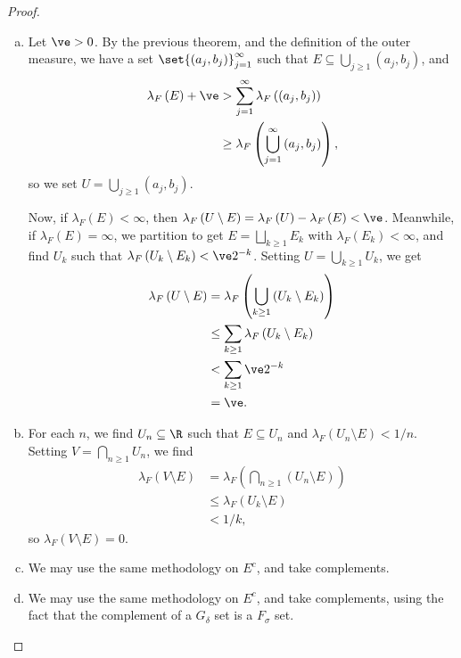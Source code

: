 \documentclass[10pt]{mypackage}
\begin{document}
\begin{proof}\hfill
  \begin{enumerate}[(a)]
    \item Let $\ve > 0$. By the previous theorem, and the definition of the outer measure, we have a set $\set{\left( a_j,b_j \right)}_{j=1}^{\infty}$ such that $E\subseteq \bigcup_{j\geq 1}\left( a_j,b_j \right)$, and
      \begin{align*}
        \lambda_F\left( E \right) + \ve &> \sum_{j=1}^{\infty}\lambda_F\left( \left( a_j,b_j \right) \right)\\
                                        &\geq \lambda_F\left( \bigcup_{j=1}^{\infty}\left( a_j,b_j \right) \right),
      \end{align*}
      so we set $U = \bigcup_{j\geq 1}\left( a_j,b_j \right)$.\newline

      Now, if $\lambda_F\left( E \right) < \infty$, then $\lambda_F\left( U\setminus E \right) = \lambda_F\left( U \right) - \lambda_F\left( E \right) < \ve$. Meanwhile, if $\lambda_F\left( E \right) =\infty$, we partition to get $E = \bigsqcup_{k\geq 1}E_k$ with $\lambda_F\left( E_k \right) < \infty$, and find $U_k$ such that $\lambda_F\left( U_k \setminus E_k \right) < \ve 2^{-k}$. Setting $U = \bigcup_{k\geq 1}U_k$, we get
      \begin{align*}
        \lambda_F\left( U\setminus E \right) &= \lambda_F\left( \bigcup_{k\geq 1}\left( U_k\setminus E_k \right) \right)\\
                                             &\leq \sum_{k\geq 1}\lambda_F\left( U_k\setminus E_k \right)\\
                                             &< \sum_{k\geq 1}\ve 2^{-k}\\
                                             &= \ve.
      \end{align*}
    \item For each $n$, we find $U_n\subseteq \R$ such that $E\subseteq U_n$ and $\lambda_F\left( U_n\setminus E \right) < 1/n$. Setting $V = \bigcap_{n\geq 1}U_n$, we find
      \begin{align*}
        \lambda_F\left( V\setminus E \right) &= \lambda_F\left( \bigcap_{n\geq 1}\left( U_n\setminus E \right) \right)\\
                                             &\leq \lambda_F\left( U_k\setminus E \right) \tag*{for all $k$}\\
                                             &< 1/k,
      \end{align*}
      so $\lambda_F\left( V\setminus E \right) = 0$.
    \item We may use the same methodology on $E^{c}$, and take complements.
    \item We may use the same methodology on $E^{c}$, and take complements, using the fact that the complement of a $G_{\delta}$ set is a $F_{\sigma}$ set.
  \end{enumerate}
\end{proof}
\end{document}
